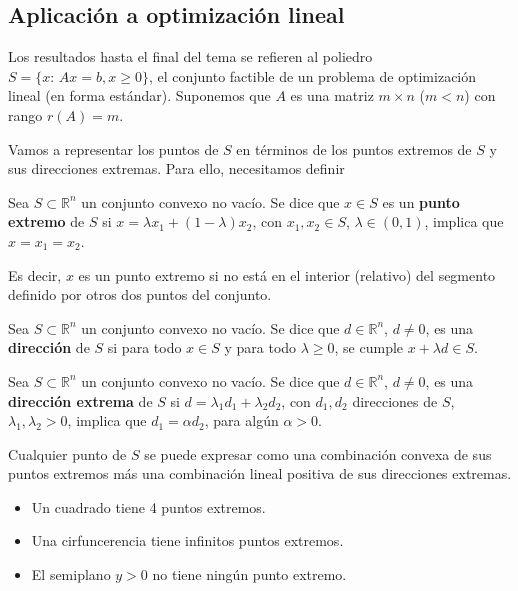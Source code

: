 \subsection{Aplicación a optimización lineal}

\label{subsec:AppOptLin}
Los resultados hasta el final del tema se refieren al poliedro $S=\{x:\, Ax=b, x\geq 0\}$, el conjunto factible de un problema de optimización lineal (en forma estándar).
Suponemos que $A$ es una matriz $m\times n$ ($m<n$) con rango $r(A)=m$.


Vamos a representar los puntos de $S$ en términos de los puntos extremos de $S$ y sus direcciones extremas. Para ello, necesitamos definir

\begin{defn}
Sea $S\subset\mathbb{R}^n$ un conjunto convexo no vacío. Se dice que $x\in S$ es un \textbf{punto extremo} de $S$ si $x=\lambda x_1 + (1-\lambda) x_2$, con $x_1,x_2\in S$, $\lambda\in (0,1)$, implica que $x=x_1=x_2$.
\end{defn}

Es decir, $x$ es un punto extremo si no está en el interior (relativo) del segmento definido por otros dos puntos del conjunto.


\begin{defn}
Sea $S\subset\mathbb{R}^n$ un conjunto convexo no vacío. Se dice que $d\in \mathbb{R}^n$, $d\neq 0$, es una \textbf{dirección} de $S$ si para todo $x\in S$ y para todo $\lambda\geq 0$, se cumple $x + \lambda d \in S$.
\end{defn}

\begin{defn}
Sea $S\subset\mathbb{R}^n$ un conjunto convexo no vacío. Se dice que $d\in \mathbb{R}^n$, $d\neq 0$, es una \textbf{dirección extrema } de $S$ si $d=\lambda_1 d_1 + \lambda_2 d_2$, con $d_1,d_2$ direcciones de $S$, $\lambda_1,\lambda_2 > 0$, implica que $d_1= \alpha d_2$, para algún $\alpha>0$.
\end{defn}

\obs

\begin{prop}
Cualquier punto de $S$ se puede expresar como una combinación convexa de sus puntos extremos más una combinación lineal positiva de sus direcciones extremas.
\end{prop}

\begin{example}
\begin{itemize}
	\item Un cuadrado tiene 4 puntos extremos.
	\item Una cirfuncerencia tiene infinitos puntos extremos.
	\item El semiplano $y>0$ no tiene ningún punto extremo.
\end{itemize}
\end{example}


